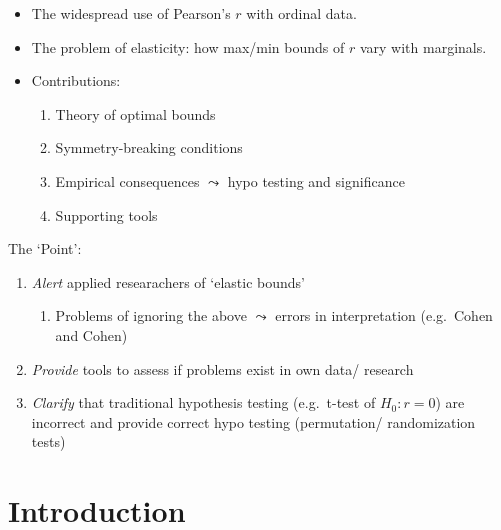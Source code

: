 \documentclass[
  12pt,
]{article}
\providecommand{\tightlist}{%
  \setlength{\itemsep}{0pt}\setlength{\parskip}{0pt}}\usepackage{longtable,booktabs,array}
\begin{document}
\begin{itemize}
\item
  The widespread use of Pearson's \(r\) with ordinal data.\\
\item
  The problem of elasticity: how max/min bounds of \(r\) vary with
  marginals.\\
\item
  Contributions:

  \begin{enumerate}
  \def\labelenumi{\arabic{enumi}.}
  \tightlist
  \item
    Theory of optimal bounds\\
  \item
    Symmetry-breaking conditions\\
  \item
    Empirical consequences \(\leadsto\) hypo testing and significance
  \item
    Supporting tools
  \end{enumerate}
\end{itemize}

The `Point':

\begin{enumerate}
\def\labelenumi{\arabic{enumi}.}
\tightlist
\item
  \emph{Alert} applied researachers of `elastic bounds'

  \begin{enumerate}
  \def\labelenumii{\arabic{enumii}.}
  \tightlist
  \item
    Problems of ignoring the above \(\leadsto\) errors in interpretation
    (e.g.~Cohen and Cohen)
  \end{enumerate}
\item
  \emph{Provide} tools to assess if problems exist in own data/ research
\item
  \emph{Clarify} that traditional hypothesis testing (e.g.~t-test of
  \(H_0: r= 0\)) are incorrect and provide correct hypo testing
  (permutation/ randomization tests)
\end{enumerate}

\section{Introduction}\label{introduction}
\end{document}

